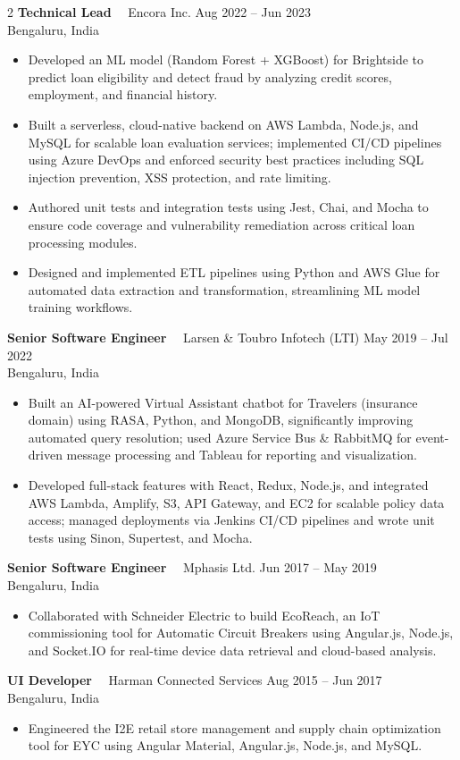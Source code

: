 \documentclass[10pt,a4paper]{article}
\newcommand{\job}[4]{%
  \vspace{2pt}
  {\fontsize{10.5}{12}\bfseries\color{sidebar}#1}
  {\color{textmuted}\ \textbar\ #2}
  \hfill
  {\fontsize{8.8}{10}\color{accent}#3}\\
  {\fontsize{8.7}{10}\color{textmuted}#4}
  \vspace{1pt}
}
\begin{document}
\begin{paracol}{2}
\job{Technical Lead}{Encora Inc.}{Aug 2022 -- Jun 2023}{Bengaluru, India}
\begin{itemize}
  \item Developed an ML model (Random Forest + XGBoost) for Brightside to predict loan eligibility and detect fraud by analyzing credit scores, employment, and financial history.
  \item Built a serverless, cloud-native backend on AWS Lambda, Node.js, and MySQL for scalable loan evaluation services; implemented CI/CD pipelines using Azure DevOps and enforced security best practices including SQL injection prevention, XSS protection, and rate limiting.
  \item Authored unit tests and integration tests using Jest, Chai, and Mocha to ensure code coverage and vulnerability remediation across critical loan processing modules.
  \item Designed and implemented ETL pipelines using Python and AWS Glue for automated data extraction and transformation, streamlining ML model training workflows.
\end{itemize}

\job{Senior Software Engineer}{Larsen \& Toubro Infotech (LTI)}{May 2019 -- Jul 2022}{Bengaluru, India}
\begin{itemize}
  \item Built an AI-powered Virtual Assistant chatbot for Travelers (insurance domain) using RASA, Python, and MongoDB, significantly improving automated query resolution; used Azure Service Bus \& RabbitMQ for event-driven message processing and Tableau for reporting and visualization.
  \item Developed full-stack features with React, Redux, Node.js, and integrated AWS Lambda, Amplify, S3, API Gateway, and EC2 for scalable policy data access; managed deployments via Jenkins CI/CD pipelines and wrote unit tests using Sinon, Supertest, and Mocha.
\end{itemize}

\job{Senior Software Engineer}{Mphasis Ltd.}{Jun 2017 -- May 2019}{Bengaluru, India}
\begin{itemize}
  \item Collaborated with Schneider Electric to build EcoReach, an IoT commissioning tool for Automatic Circuit Breakers using Angular.js, Node.js, and Socket.IO for real-time device data retrieval and cloud-based analysis.
\end{itemize}

\job{UI Developer}{Harman Connected Services}{Aug 2015 -- Jun 2017}{Bengaluru, India}
\begin{itemize}
  \item Engineered the I2E retail store management and supply chain optimization tool for EYC using Angular Material, Angular.js, Node.js, and MySQL.
\end{itemize}


\end{paracol}
\end{document}
